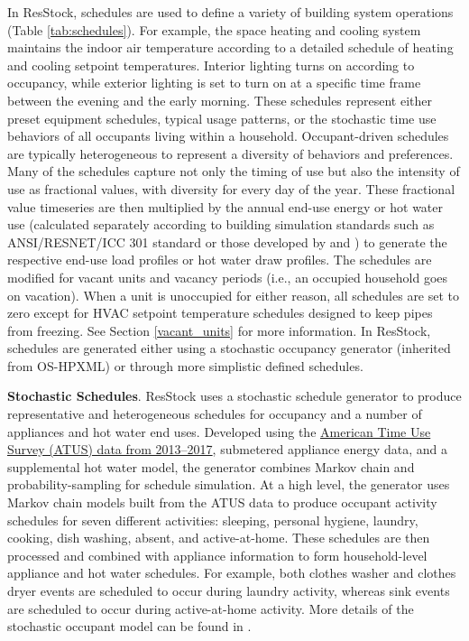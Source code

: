 In ResStock, schedules are used to define a variety of building system operations (Table \ref{tab:schedules}). For example, the space heating and cooling system maintains the indoor air temperature according to a detailed schedule of heating and cooling setpoint temperatures. Interior lighting turns on according to occupancy, while exterior lighting is set to turn on at a specific time frame between the evening and the early morning. These schedules represent either preset equipment schedules, typical usage patterns, or the stochastic time use behaviors of all occupants living within a household. Occupant-driven schedules are typically heterogeneous to represent a diversity of behaviors and preferences. Many of the schedules capture not only the timing of use but also the intensity of use as fractional values, with diversity for every day of the year. These fractional value timeseries are then multiplied by the annual end-use energy or hot water use (calculated separately according to building simulation standards such as ANSI/RESNET/ICC 301 standard or those developed by \cite{bahsp_2010} and \cite{Wilson2014}) to generate the respective end-use load profiles or hot water draw profiles. The schedules are modified for vacant units and vacancy periods (i.e., an occupied household goes on vacation). When a unit is unoccupied for either reason, all schedules are set to zero except for HVAC setpoint temperature schedules designed to keep pipes from freezing. See Section \ref{vacant_units} for more information. In ResStock, schedules are generated either using a stochastic occupancy generator (inherited from OS-HPXML) or through more simplistic defined schedules. %

\textbf{Stochastic Schedules}. ResStock uses a stochastic schedule generator to produce representative and heterogeneous schedules for occupancy and a number of appliances and hot water end uses. Developed using the \href{https://www.bls.gov/tus/}{American Time Use Survey (ATUS) data from 2013--2017}, submetered appliance energy data, and a supplemental hot water model, the generator combines Markov chain and probability-sampling for schedule simulation. At a high level, the generator uses Markov chain models built from the ATUS data to produce occupant activity schedules for seven different activities: sleeping, personal hygiene, laundry, cooking, dish washing, absent, and active-at-home. These schedules are then processed and combined with appliance information to form household-level appliance and hot water schedules. For example, both clothes washer and clothes dryer events are scheduled to occur during laundry activity, whereas sink events are scheduled to occur during active-at-home activity. More details of the stochastic occupant model can be found in \citet{Chen2022}.

